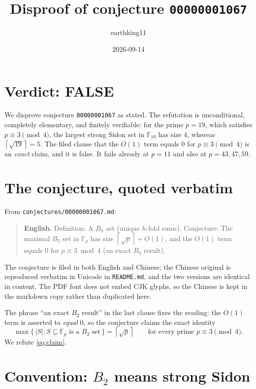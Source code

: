 \documentclass[11pt]{article}
\title{Disproof of conjecture \texttt{00000001067}}
\author{earthking11}
\date{2026-09-14}
\theoremstyle{definition}
\theoremstyle{remark}
\newcommand{\F}{\mathbb{F}}
\newcommand{\ceil}[1]{\left\lceil #1 \right\rceil}
\begin{document}
\maketitle

\section*{Verdict: FALSE}

We disprove conjecture \texttt{00000001067} as stated. The refutation is
unconditional, completely elementary, and finitely verifiable: for the prime
$p = 19$, which satisfies $p \equiv 3 \pmod 4$, the largest strong Sidon set in
$\F_{19}$ has size $4$, whereas $\ceil{\sqrt{19}} = 5$. The filed clause that
the $O(1)$ term equals $0$ for $p \equiv 3 \pmod 4$ is an \emph{exact} claim,
and it is false. It fails already at $p = 11$ and also at $p = 43, 47, 59$.

\section{The conjecture, quoted verbatim}

From \texttt{conjectures/00000001067.md}:

\begin{quote}
\textbf{English.} Definition: A $B_h$ set (unique $h$-fold sums). Conjecture:
The maximal $B_2$ set in $\F_p$ has size $\ceil{\sqrt p} + O(1)$, and the
$O(1)$ term equals $0$ for $p \equiv 3 \bmod 4$ (an exact $B_2$ result).
\end{quote}

The conjecture is filed in both English and Chinese; the Chinese original is
reproduced verbatim in Unicode in \texttt{README.md}, and the two versions are
identical in content. The PDF font does not embed CJK glyphs, so the Chinese is
kept in the markdown copy rather than duplicated here.

The phrase ``an exact $B_2$ result'' in the last clause fixes the reading: the
$O(1)$ term is asserted to \emph{equal} $0$, so the conjecture claims the exact
identity
\begin{equation}\label{eq:claim}
\max\{\,|S| : S \subseteq \F_p \text{ is a } B_2 \text{ set}\,\}
   = \ceil{\sqrt p}
\qquad \text{for every prime } p \equiv 3 \pmod 4 .
\end{equation}
We refute \eqref{eq:claim}.

\section{Convention: $B_2$ means strong Sidon}
\end{document}
